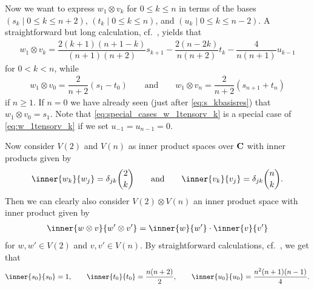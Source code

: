 Now we want to express $w_1\otimes v_k$ for $0\leq k\leq n$ in terms of the bases $(s_k \mid 0\leq k\leq n+2)$, $(t_k \mid 0\leq k\leq n)$, and $(u_k \mid 0\leq k\leq n-2)$. A straightforward but long calculation, cf.\ , yields that
\begin{align}\label{eq:w_1tensorv_k}
  w_1\otimes v_k = \dfrac{2(k+1)(n+1-k)}{(n+1)(n+2)}s_{k+1} - \dfrac{2(n-2k)}{n(n+2)}t_k - \dfrac{4}{n(n+1)}u_{k-1}
\end{align}
for $0<k<n$, while
\begin{align}\label{eq:special_cases_w_1tensorv_k}
  w_1\otimes v_0 = \dfrac{2}{n+2}(s_1-t_0) \qquad \mbox{and} \qquad w_1\otimes v_n = \dfrac{2}{n+2}(s_{n+1}+t_n)
\end{align}
if $n\geq 1$. If $n=0$ we have already seen (just after \cref{eq:s_kbasisres}) that $w_1\otimes v_0 = s_1$. Note that \cref{eq:special_cases_w_1tensorv_k} is a special case of \cref{eq:w_1tensorv_k} if we set $u_{-1}=u_{n-1}=0$.

Now consider $V(2)$ and $V(n)$ as inner product spaces over $\mathbf{C}$ with inner products given by
\begin{align}\label{eq:inproddef1}
  \inner{w_k}{w_j} = \delta_{jk} \binom{2}{k} \qquad \mbox{and} \qquad \inner{v_k}{v_j} = \delta_{jk}\binom{n}{k}.
\end{align}
Then we can clearly also consider $V(2)\otimes V(n)$ an inner product space with inner product given by
\begin{align}\label{eq:inproddef2}
  \inner{w\otimes v}{w'\otimes v'} = \inner{w}{w'}\cdot\inner{v}{v'}
\end{align}
for $w,w'\in V(2)$ and $v,v'\in V(n)$. By straightforward calculations, cf.\ , we get that
\begin{align}\label{eq:inprodres}
  \inner{s_0}{s_0} = 1, \qquad \inner{t_0}{t_0} = \dfrac{n(n+2)}{2}, \qquad \inner{u_0}{u_0} = \dfrac{n^2(n+1)(n-1)}{4}.
\end{align}

